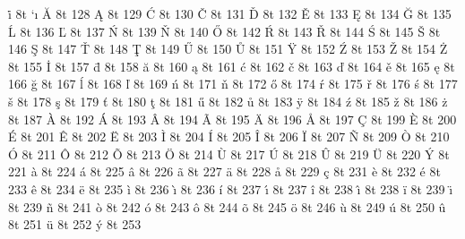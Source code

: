\accentdef  \. i    8t `\i
\accentdef  \u A    8t 128
\accentdef  \k A    8t 129
\accentdef  \' C    8t 130
\accentdef  \v C    8t 131
\accentdef  \v D    8t 132
\accentdef  \v E    8t 133
\accentdef  \k E    8t 134
\accentdef  \u G    8t 135
\accentdef  \' L    8t 136
\accentdef  \v L    8t 137
\accentdef  \' N    8t 139
\accentdef  \v N    8t 140
\accentdef  \H O    8t 142
\accentdef  \' R    8t 143
\accentdef  \v R    8t 144
\accentdef  \' S    8t 145
\accentdef  \v S    8t 146
\accentdef  \c S    8t 147
\accentdef  \v T    8t 148
\accentdef  \c T    8t 149
\accentdef  \H U    8t 150
\accentdef  \r U    8t 151
\accentdef  \" Y    8t 152
\accentdef  \' Z    8t 153
\accentdef  \v Z    8t 154
\accentdef  \. Z    8t 155
\accentdef  \. I    8t 157
\accentdef  \= d    8t 158
\accentdef  \u a    8t 160
\accentdef  \k a    8t 161
\accentdef  \' c    8t 162
\accentdef  \v c    8t 163
\accentdef  \v d    8t 164
\accentdef  \v e    8t 165
\accentdef  \k e    8t 166
\accentdef  \u g    8t 167
\accentdef  \' l    8t 168
\accentdef  \v l    8t 169
\accentdef  \' n    8t 171
\accentdef  \v n    8t 172
\accentdef  \H o    8t 174
\accentdef  \' r    8t 175
\accentdef  \v r    8t 176
\accentdef  \' s    8t 177
\accentdef  \v s    8t 178
\accentdef  \c s    8t 179
\accentdef  \v t    8t 180
\accentdef  \c t    8t 181
\accentdef  \H u    8t 182
\accentdef  \r u    8t 183
\accentdef  \" y    8t 184
\accentdef  \' z    8t 185
\accentdef  \v z    8t 186
\accentdef  \. z    8t 187
\accentdef  \` A    8t 192
\accentdef  \' A    8t 193
\accentdef  \^ A    8t 194
\accentdef  \~ A    8t 195
\accentdef  \" A    8t 196
\accentdef  \r A    8t 197
\accentdef  \c C    8t 199
\accentdef  \` E    8t 200
\accentdef  \' E    8t 201
\accentdef  \^ E    8t 202
\accentdef  \" E    8t 203
\accentdef  \` I    8t 204
\accentdef  \' I    8t 205
\accentdef  \^ I    8t 206
\accentdef  \" I    8t 207
\accentdef  \~ N    8t 209
\accentdef  \` O    8t 210
\accentdef  \' O    8t 211
\accentdef  \^ O    8t 212
\accentdef  \~ O    8t 213
\accentdef  \" O    8t 214
\accentdef  \` U    8t 217
\accentdef  \' U    8t 218
\accentdef  \^ U    8t 219
\accentdef  \" U    8t 220
\accentdef  \' Y    8t 221
\accentdef  \` a    8t 224
\accentdef  \' a    8t 225
\accentdef  \^ a    8t 226
\accentdef  \~ a    8t 227
\accentdef  \" a    8t 228
\accentdef  \r a    8t 229
\accentdef  \c c    8t 231
\accentdef  \` e    8t 232
\accentdef  \' e    8t 233
\accentdef  \^ e    8t 234
\accentdef  \" e    8t 235
\accentdef  \` i    8t 236
\accentdef  \` {\i} 8t 236
\accentdef  \' i    8t 237
\accentdef  \' {\i} 8t 237
\accentdef  \^ i    8t 238
\accentdef  \^ {\i} 8t 238
\accentdef  \" i    8t 239
\accentdef  \" {\i} 8t 239
\accentdef  \~ n    8t 241
\accentdef  \` o    8t 242
\accentdef  \' o    8t 243
\accentdef  \^ o    8t 244
\accentdef  \~ o    8t 245
\accentdef  \" o    8t 246
\accentdef  \` u    8t 249
\accentdef  \' u    8t 250
\accentdef  \^ u    8t 251
\accentdef  \" u    8t 252
\accentdef  \' y    8t 253


